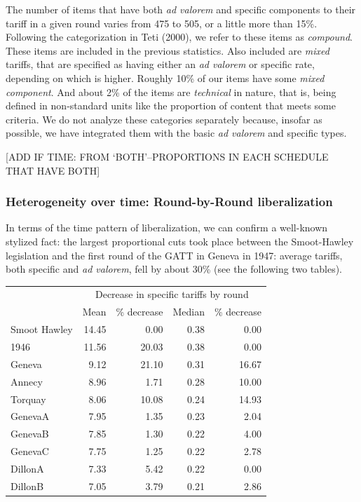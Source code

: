 \documentclass[
  12pt,
]{article}
\begin{document}
The number of items that have both \emph{ad valorem} and specific components to their tariff in a given round varies from 475 to 505, or a little more than 15\%. Following the categorization in Teti (2000), we refer to these items as \emph{compound}. These items are included in the previous statistics. Also included are \emph{mixed} tariffs, that are specified as having either an \emph{ad valorem} or specific rate, depending on which is higher. Roughly 10\% of our items have some \emph{mixed component}. And about 2\% of the items are \emph{technical} in nature, that is, being defined in non-standard units like the proportion of content that meets some criteria. We do not analyze these categories separately because, insofar as possible, we have integrated them with the basic \emph{ad valorem} and specific types.

{[}ADD IF TIME: FROM `BOTH'--PROPORTIONS IN EACH SCHEDULE THAT HAVE BOTH{]}

\hypertarget{heterogeneity-over-time-round-by-round-liberalization}{%
\subsubsection{Heterogeneity over time: Round-by-Round liberalization}\label{heterogeneity-over-time-round-by-round-liberalization}}

In terms of the time pattern of liberalization, we can confirm a well-known stylized fact: the largest proportional cuts took place between the Smoot-Hawley legislation and the first round of the GATT in Geneva in 1947: average tariffs, both specific and \emph{ad valorem}, fell by about 30\% (see the following two tables).

\begin{table}[!h]
\centering
\begin{tabular}[t]{lrrrr}
\toprule
\multicolumn{1}{c}{\bgroup\fontsize{12}{14}\selectfont  \egroup{}} & \multicolumn{4}{c}{\bgroup\fontsize{12}{14}\selectfont Decrease in specific tariffs by round\egroup{}} \\
\cmidrule(l{3pt}r{3pt}){2-5}
  & Mean & \% decrease & Median & \% decrease\\
\midrule
Smoot Hawley & 14.45 & 0.00 & 0.38 & 0.00\\
1946 & 11.56 & 20.03 & 0.38 & 0.00\\
Geneva & 9.12 & 21.10 & 0.31 & 16.67\\
Annecy & 8.96 & 1.71 & 0.28 & 10.00\\
Torquay & 8.06 & 10.08 & 0.24 & 14.93\\
\addlinespace
GenevaA & 7.95 & 1.35 & 0.23 & 2.04\\
GenevaB & 7.85 & 1.30 & 0.22 & 4.00\\
GenevaC & 7.75 & 1.25 & 0.22 & 2.78\\
DillonA & 7.33 & 5.42 & 0.22 & 0.00\\
DillonB & 7.05 & 3.79 & 0.21 & 2.86\\
\bottomrule
\end{tabular}
\end{table}
\end{document}
